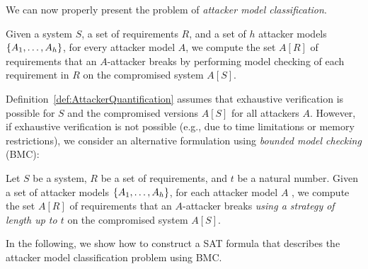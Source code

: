 We can now properly present the problem of \emph{attacker model classification}.
\begin{definition} 
\label{def:AttackerQuantification}
Given a system $S$, a set of requirements $R$, and a set of $h$ attacker models
$\left\{A_1, \ldots , A_h\right\}$, for every attacker model $A$, we compute the set $A[R]$ of requirements that an $A$-attacker breaks by performing model checking of each requirement in $R$ on the compromised system $A[S]$. 
\end{definition}

Definition~\ref{def:AttackerQuantification} assumes that exhaustive verification is possible for $S$ and the compromised versions $A[S]$ for all attackers $A$. However, if exhaustive verification is not possible (e.g., due to time limitations or memory restrictions), we consider an alternative formulation using \emph{bounded model checking} (BMC): 
\begin{definition} 
\label{def:BoundedModelCheckingOfSystems}
Let $S$ be a system, $R$ be a set of requirements, and $t$ be a natural number. Given a set of attacker models $\left\{A_1, \ldots , A_h\right\}$, for each attacker model $A$ , we compute the set $A[R]$ of requirements that an $A$-attacker breaks \emph{using a strategy of length up to $t$} on the compromised system $A[S]$. 
\end{definition}
In the following, we show how to construct a SAT formula that describes the attacker model classification problem using BMC. 

